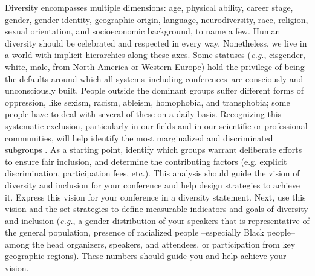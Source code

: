 \documentclass[10pt,letterpaper]{article}
\begin{document}
Diversity encompasses multiple dimensions: age, physical ability, career stage, gender, gender identity, geographic origin, language, neurodiversity, race, religion, sexual orientation, and socioeconomic background, to name a few.
Human diversity should be celebrated and respected in every way. 
Nonetheless, we live in a world with implicit hierarchies along these axes. 
Some statuses (\textit{e.g.}, cisgender, white, male, from North America or Western Europe) hold the privilege of being the defaults around which all systems--including conferences--are consciously and unconsciously built. 
People outside the dominant groups suffer different forms of oppression, like sexism, racism, ableism, homophobia, and transphobia; some people have to deal with several of these on a daily basis.
Recognizing this systematic exclusion, particularly in our fields and in our scientific or professional communities, will help identify the most marginalized and discriminated subgroups \cite{timperleyHeMoanaPukepuke2020}.
As a starting point, identify which groups warrant deliberate efforts to ensure fair inclusion, and determine the contributing factors (e.g. explicit discrimination, participation fees, etc.).
This analysis should guide the vision of diversity and inclusion for your conference and help design strategies to achieve it. 
Express this vision for your conference in a diversity statement. 
Next, use this vision and the set strategies to define measurable indicators and goals of diversity and inclusion (\textit{e.g.}, a gender distribution of your speakers that is representative of the general population, presence of racialized people --especially Black people-- among the head organizers, speakers, and attendees, or participation from key geographic regions). 
These numbers should guide you and help achieve your vision.

\end{document}
